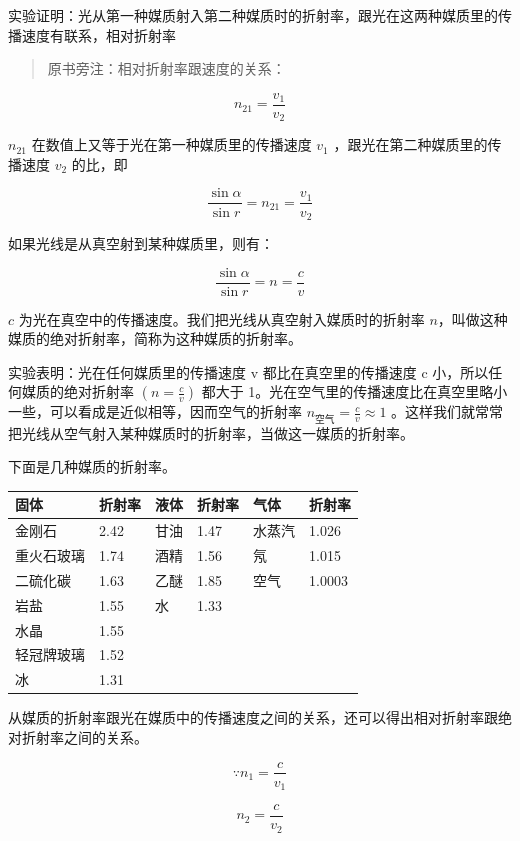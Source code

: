 实验证明：光从第一种媒质射入第二种媒质时的折射率，跟光在这两种媒质里的传播速度有联系，相对折射率

\begin{quote}
原书旁注：相对折射率跟速度的关系：
\end{quote}

\[
n _ {21} = \frac {v _ {1}}{v _ {2}}
\]

\(n_{21}\) 在数值上又等于光在第一种媒质里的传播速度 \(v_{1}\)
，跟光在第二种媒质里的传播速度 \(v_{2}\) 的比，即

\[
\frac {\sin \alpha}{\sin r} = n _ {21} = \frac {v _ {1}}{v _ {2}}
\]

如果光线是从真空射到某种媒质里，则有：

\[
\frac {\sin \alpha}{\sin r} = n = \frac {c}{v}
\]

\(c\) 为光在真空中的传播速度。我们把光线从真空射入媒质时的折射率
\(n\)，叫做这种媒质的绝对折射率，简称为这种媒质的折射率。

实验表明：光在任何媒质里的传播速度 v 都比在真空里的传播速度 c
小，所以任何媒质的绝对折射率 \(\left(n=\frac{c}{v}\right)\) 都大于
1。光在空气里的传播速度比在真空里略小一些，可以看成是近似相等，因而空气的折射率
\(n_{\text{空气}}=\frac{c}{v}\approx1\)
。这样我们就常常把光线从空气射入某种媒质时的折射率，当做这一媒质的折射率。

下面是几种媒质的折射率。

{\def\LTcaptype{none} %
\begin{longtable}[]{@{}llllll@{}}
\toprule\noalign{}
固体 & 折射率 & 液体 & 折射率 & 气体 & 折射率 \\
\midrule\noalign{}
\endhead
\bottomrule\noalign{}
\endlastfoot
金刚石 & 2.42 & 甘油 & 1.47 & 水蒸汽 & 1.026 \\
重火石玻璃 & 1.74 & 酒精 & 1.56 & 氖 & 1.015 \\
二硫化碳 & 1.63 & 乙醚 & 1.85 & 空气 & 1.0003 \\
岩盐 & 1.55 & 水 & 1.33 & & \\
水晶 & 1.55 & & & & \\
轻冠牌玻璃 & 1.52 & & & & \\
冰 & 1.31 & & & & \\
\end{longtable}
}

从媒质的折射率跟光在媒质中的传播速度之间的关系，还可以得出相对折射率跟绝对折射率之间的关系。

\[
\because n _ {1} = \frac {c}{v _ {1}}
\]

\[
n _ {2} = \frac {c}{v _ {2}}
\]

